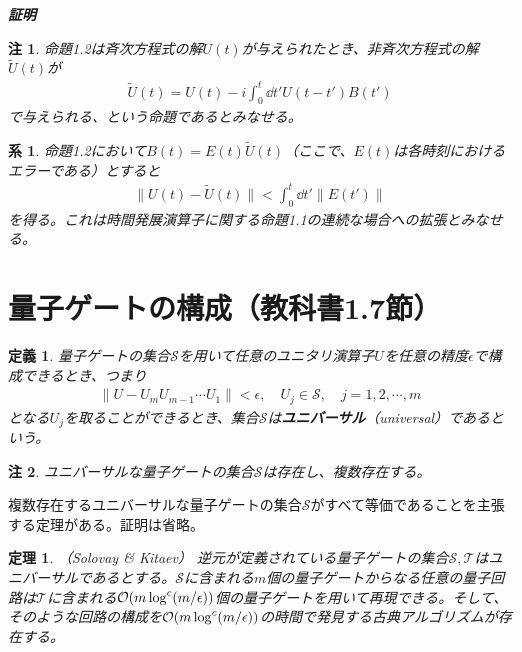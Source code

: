 \documentclass[dvipdfmx]{jarticle}
\makeatletter
\numberwithin{equation}{section}
\renewenvironment{proof}[1][\proofname]{\par
  \pushQED{\qed}
  \normalfont \topsep6\p@\@plus6\p@\relax
  \trivlist
  \item\relax
  {\itshape
  #1\@addpunct{ }}\hspace\labelsep\ignorespaces
}{
  \popQED\endtrivlist\@endpefalse
}
\theoremstyle{seminar}
\newtheorem{theorem}{定理}[section]
\newtheorem{definition}{定義}[section]
\newtheorem{corollary}{系}[section]
\newtheorem{remark}{注}[section]
\renewcommand{\proofname}{\textbf{証明}}
\makeatother
\begin{document}
\begin{proof}
  
\end{proof}

\begin{remark}
  命題1.2は斉次方程式の解$U(t)$が与えられたとき、非斉次方程式の解$\tilde{U}(t)$が
  \begin{align}
    \tilde{U}(t) = U(t) - i\int_0^t \dd t' U(t - t')B(t')
  \end{align}
  で与えられる、という命題であるとみなせる。
\end{remark}

\begin{corollary}
  命題1.2において$B(t) = E(t)\tilde{U}(t)$（ここで、$E(t)$は各時刻におけるエラーである）とすると
  \begin{align}
    \| U(t) - \tilde{U}(t) \| < \int_0^t \dd t' \| E(t') \|
  \end{align}
  を得る。これは時間発展演算子に関する命題1.1の連続な場合への拡張とみなせる。
\end{corollary}
\section{量子ゲートの構成（教科書1.7節）}

\begin{definition}
  量子ゲートの集合$\mathcal{S}$を用いて任意のユニタリ演算子$U$を任意の精度$\epsilon$で構成できるとき、つまり
  \begin{align}
    \| U - U_m U_{m-1} \cdots U_1 \| < \epsilon, \quad U_j \in \mathcal{S}, \quad j = 1, 2, \cdots, m
  \end{align}
  となる$U_j$を取ることができるとき、集合$\mathcal{S}$は{\bf ユニバーサル}（universal）であるという。
\end{definition}

\begin{remark}
  ユニバーサルな量子ゲートの集合$\mathcal{S}$は存在し、複数存在する。
\end{remark}

複数存在するユニバーサルな量子ゲートの集合$\mathcal{S}$がすべて等価であることを主張する定理がある。証明は省略。
\begin{theorem}（Solovay \& Kitaev）
  逆元が定義されている量子ゲートの集合$\mathcal{S}, \mathcal{T}$はユニバーサルであるとする。$\mathcal{S}$に含まれる$m$個の量子ゲートからなる任意の量子回路は$\mathcal{T}$に含まれる$\mathcal{O}\qty(m \log^c (m / \epsilon))$個の量子ゲートを用いて再現できる。そして、そのような回路の構成を$\mathcal{O}\qty(m \log^c (m / \epsilon))$の時間で発見する古典アルゴリズムが存在する。
\end{theorem}
\end{document}
